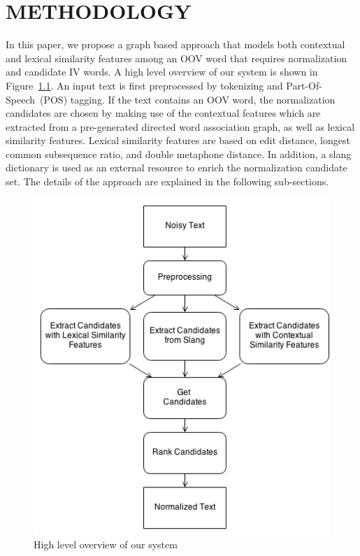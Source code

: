 \documentclass[a4paper,onesided,12pt]{report}
\begin{document}


\chapter{METHODOLOGY}
\label{chapter:method}



In this paper, we propose a graph based approach that models both contextual and lexical similarity features among an OOV word that requires normalization and candidate IV words. A high level overview of our system is shown in Figure~\ref{fig:overview}. An input text is first preprocessed by tokenizing and Part-Of-Speech~(POS) tagging. If the text contains an OOV word, the normalization candidates are chosen by making use of the contextual features which are extracted from a pre-generated directed word association graph, as well as lexical similarity features. Lexical similarity features are based on edit distance, longest common subsequence ratio, and double metaphone distance. In addition, a slang dictionary is used as an external resource to enrich the normalization candidate set. The details of the approach are explained in the following sub-sections.

\begin{figure}[htb]
\begin{center}
\includegraphics[scale=0.6]{fig/overview}
\caption{High level overview of our system}
\label{fig:overview}
\end{center}
\end{figure}
\end{document}
